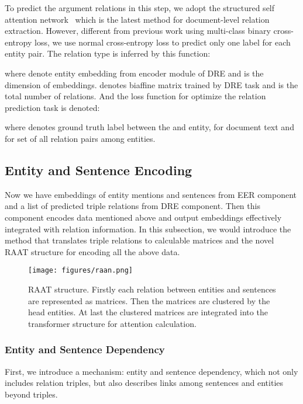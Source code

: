 \documentclass[11pt]{article}
\begin{document}
To predict the argument relations in this step, we adopt the structured self attention network~\cite{SSAN} which is the latest method for document-level relation extraction. However, different from previous work using multi-class binary cross-entropy loss, we use normal cross-entropy loss to predict only one label for each entity pair. The relation type is inferred by this function:

where  denote entity embedding from encoder module of DRE and  is the dimension of embeddings.  denotes biaffine matrix trained by DRE task and  is the total number of relations.
And the loss function for optimize the relation prediction task is denoted:

where  denotes ground truth label between the  and  entity,  for document text and  for set of all relation pairs among entities.

\subsection{Entity and Sentence Encoding}

Now we have embeddings of entity mentions and sentences from EER component and a list of predicted triple relations from DRE component. Then this component encodes data mentioned above and output embeddings effectively integrated with relation information. In this subsection, we would introduce the method that translates triple relations to calculable matrices and the novel RAAT structure for encoding all the above data.

\begin{figure}
    \centering
    \texttt{[image: figures/raan.png]}
    \caption{RAAT structure. Firstly each relation between entities and sentences are represented as matrices. Then the matrices are clustered by the head entities. At last the clustered matrices are integrated into the transformer structure for attention calculation.}
    \label{fig:raan structure}
\end{figure}

\subsubsection{Entity and Sentence Dependency}

First, we introduce a mechanism: entity and sentence dependency, which not only includes relation triples, but also describes links among sentences and entities beyond triples. 
\end{document}
